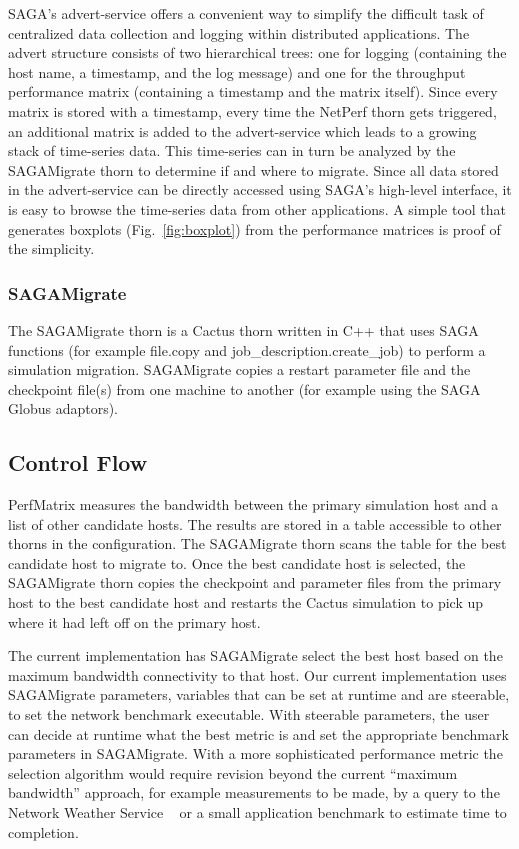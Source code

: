 \documentclass[conference,final]{IEEEtran}
\begin{document}
SAGA's advert-service offers a convenient way to simplify the
difficult task of centralized data collection and logging within
distributed applications. The advert structure consists of two
hierarchical trees: one for logging (containing the host name, a
timestamp, and the log message) and one for the throughput performance
matrix (containing a timestamp and the matrix itself). Since every
matrix is stored with a timestamp, every time the NetPerf thorn gets
triggered, an additional matrix is added to the advert-service which
leads to a growing stack of time-series data. This time-series can in
turn be analyzed by the SAGAMigrate thorn to determine if and where
to migrate.  Since all data stored in the advert-service can be
directly accessed using SAGA's high-level interface, it is easy to
browse the time-series data from other applications. A simple tool
that generates boxplots (Fig.~\ref{fig:boxplot}) from the performance
matrices is proof of the simplicity.

\subsubsection{SAGAMigrate} The SAGAMigrate thorn is a Cactus thorn
written in C++ that uses SAGA functions (for example file.copy and
job\_description.create\_job) to perform a simulation migration.
SAGAMigrate copies a restart parameter file and the checkpoint file(s)
from one machine to another (for example using the SAGA Globus
adaptors).

 \subsection{Control Flow} 

PerfMatrix measures the bandwidth between the primary simulation host
and a list of other candidate hosts. The results are stored in a
table accessible to other thorns in the configuration. The
SAGAMigrate thorn scans the table for the best candidate host to
migrate to. Once the best candidate host is selected, the SAGAMigrate
thorn copies the checkpoint and parameter files from the primary host
to the best candidate host and restarts the Cactus simulation to pick
up where it had left off on the primary host.

The current implementation has SAGAMigrate select the best host based
on the maximum bandwidth connectivity to that host. Our current
implementation uses SAGAMigrate parameters, variables that can be set
at runtime and are steerable, to set the network benchmark executable.
With steerable parameters, the user can decide at runtime what the
best metric is and set the appropriate benchmark parameters in
SAGAMigrate. With a more sophisticated performance metric the
selection algorithm would require revision beyond the current
``maximum bandwidth'' approach, for example measurements to be made,
by a query to the Network Weather Service ~\cite{NWS_web, bqp_url} or
a small application benchmark to estimate time to completion.
\end{document}
